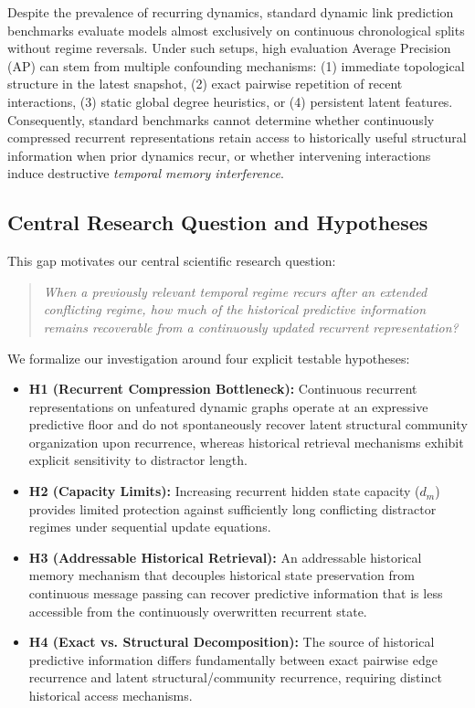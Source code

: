 \documentclass[10pt,twocolumn,letterpaper]{article}
\begin{document}
Despite the prevalence of recurring dynamics, standard dynamic link prediction benchmarks \citep{poursafaei2022towards, huang2023temporal, huang2024tgb2} evaluate models almost exclusively on continuous chronological splits without regime reversals. Under such setups, high evaluation Average Precision (AP) can stem from multiple confounding mechanisms: (1) immediate topological structure in the latest snapshot, (2) exact pairwise repetition of recent interactions, (3) static global degree heuristics, or (4) persistent latent features. Consequently, standard benchmarks cannot determine whether continuously compressed recurrent representations retain access to historically useful structural information when prior dynamics recur, or whether intervening interactions induce destructive \textit{temporal memory interference}.

\subsection{Central Research Question and Hypotheses}
This gap motivates our central scientific research question:
\begin{quote}
\textit{When a previously relevant temporal regime recurs after an extended conflicting regime, how much of the historical predictive information remains recoverable from a continuously updated recurrent representation?}
\end{quote}

We formalize our investigation around four explicit testable hypotheses:
\begin{itemize}
    \item \textbf{H1 (Recurrent Compression Bottleneck):} Continuous recurrent representations on unfeatured dynamic graphs operate at an expressive predictive floor and do not spontaneously recover latent structural community organization upon recurrence, whereas historical retrieval mechanisms exhibit explicit sensitivity to distractor length.
    \item \textbf{H2 (Capacity Limits):} Increasing recurrent hidden state capacity ($d_m$) provides limited protection against sufficiently long conflicting distractor regimes under sequential update equations.
    \item \textbf{H3 (Addressable Historical Retrieval):} An addressable historical memory mechanism that decouples historical state preservation from continuous message passing can recover predictive information that is less accessible from the continuously overwritten recurrent state.
    \item \textbf{H4 (Exact vs. Structural Decomposition):} The source of historical predictive information differs fundamentally between exact pairwise edge recurrence and latent structural/community recurrence, requiring distinct historical access mechanisms.
\end{itemize}
\end{document}
